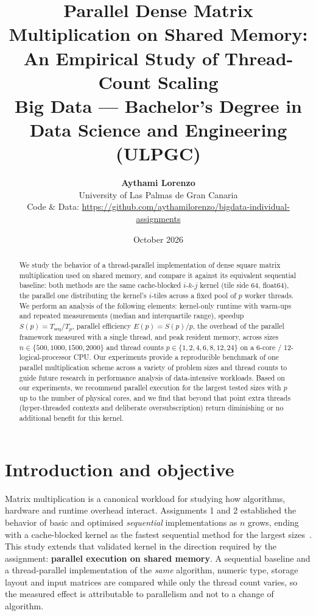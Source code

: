 \documentclass[11pt,a4paper]{article}
\title{\textbf{Parallel Dense Matrix Multiplication on Shared Memory:\\
An Empirical Study of Thread-Count Scaling}\\
\vspace{0.5cm}
\Large Big Data --- Bachelor's Degree in Data Science and Engineering (ULPGC)}
\author{\textbf{Aythami Lorenzo} \\[0.1cm]
\small University of Las Palmas de Gran Canaria \\
\small Code \& Data: \url{https://github.com/aythamilorenzo/bigdata-individual-assignments}}
\date{October 2026}
\begin{document}
\maketitle

\begin{abstract}
We study the behavior of a thread-parallel implementation of dense square
matrix multiplication used on shared memory, and compare it against its
equivalent sequential baseline: both methods are the same cache-blocked
$i$-$k$-$j$ kernel (tile side 64, float64), the parallel one distributing the
kernel's $i$-tiles across a fixed pool of $p$ worker threads. We perform an
analysis of the following elements: kernel-only runtime with warm-ups and
repeated measurements (median and interquartile range), speedup
$S(p) = T_{\mathrm{seq}} / T_p$, parallel efficiency $E(p) = S(p)/p$, the
overhead of the parallel framework measured with a single thread, and peak
resident memory, across sizes $n \in \{500, 1000, 1500, 2000\}$ and thread
counts $p \in \{1, 2, 4, 6, 8, 12, 24\}$ on a 6-core / 12-logical-processor
CPU. Our experiments provide a reproducible benchmark of one parallel
multiplication scheme across a variety of problem sizes and thread counts to
guide future research in performance analysis of data-intensive workloads.
Based on our experiments, we recommend parallel execution for the largest
tested sizes with $p$ up to the number of physical cores, and we find that
beyond that point extra threads (hyper-threaded contexts and deliberate
oversubscription) return diminishing or no additional benefit for this
kernel.
\end{abstract}

\newpage
\tableofcontents
\newpage

\section{Introduction and objective}
\label{sec:introduction}

Matrix multiplication is a canonical workload for studying how algorithms,
hardware and runtime overhead interact. Assignments 1 and 2 established the
behavior of basic and optimised \emph{sequential} implementations as $n$
grows, ending with a cache-blocked kernel as the fastest sequential method
for the largest sizes~\cite{lam1991}. This study extends that validated
kernel in the direction required by the assignment: \textbf{parallel
execution on shared memory}. A sequential baseline and a thread-parallel
implementation of the \emph{same} algorithm, numeric type, storage layout
and input matrices are compared while only the thread count varies, so the
measured effect is attributable to parallelism and not to a change of
algorithm.
\end{document}
